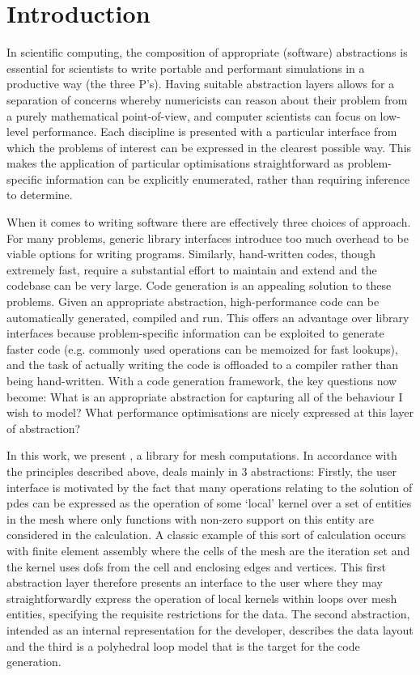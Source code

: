 \section{Introduction}

In scientific computing, the composition of appropriate (software) abstractions is essential for scientists to write portable and performant simulations in a productive way (the three P's).
Having suitable abstraction layers allows for a separation of concerns whereby numericists can reason about their problem from a purely mathematical point-of-view, and computer scientists can focus on low-level performance.
Each discipline is presented with a particular interface from which the problems of interest can be expressed in the clearest possible way.
This makes the application of particular optimisations straightforward as problem-specific information can be explicitly enumerated, rather than requiring inference to determine.

When it comes to writing software there are effectively three choices of approach.
For many problems, generic library interfaces introduce too much overhead to be viable options for writing programs.
Similarly, hand-written codes, though extremely fast, require a substantial effort to maintain and extend and the codebase can be very large.
Code generation is an appealing solution to these problems.
Given an appropriate abstraction, high-performance code can be automatically generated, compiled and run.
This offers an advantage over library interfaces because problem-specific information can be exploited to generate faster code (e.g. commonly used operations can be memoized for fast lookups), and the task of actually writing the code is offloaded to a compiler rather than being hand-written.
With a code generation framework, the key questions now become:
What is an appropriate abstraction for capturing all of the behaviour I wish to model?
What performance optimisations are nicely expressed at this layer of abstraction?

In this work, we present \projectname, a library for mesh computations.
In accordance with the principles described above, \projectname deals mainly in 3 abstractions:
Firstly, the user interface is motivated by the fact that many operations relating to the solution of \gls{pde}s can be expressed as the operation of some `local' kernel over a set of entities in the mesh where only functions with non-zero support on this entity are considered in the calculation.
A classic example of this sort of calculation occurs with finite element assembly where the cells of the mesh are the iteration set and the kernel uses \gls{dofs} from the cell and enclosing edges and vertices.
This first abstraction layer therefore presents an interface to the user where they may straightforwardly express the operation of local kernels within loops over mesh entities, specifying the requisite restrictions for the data.
The second abstraction, intended as an internal representation for the developer, describes the data layout and the third is a polyhedral loop model that is the target for the code generation.

